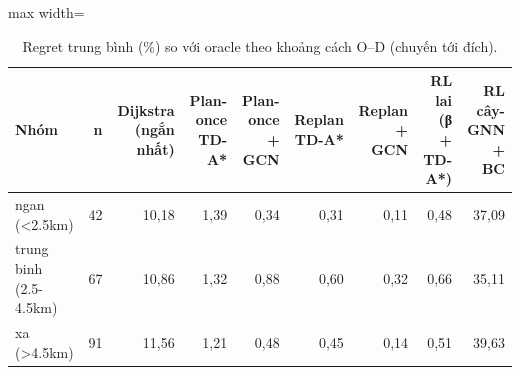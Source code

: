 \begin{table}[!htbp]
\centering
\small
\caption{Regret trung bình (\%) so với oracle theo khoảng cách O–D (chuyến tới đích).}
\label{tab:tab_by_distance}
\begin{adjustbox}{max width=\linewidth}
\begin{tabular}{lrrrrrrrr}
\toprule
Nhóm & n & Dijkstra (ngắn nhất) & Plan-once TD-A* & Plan-once + GCN & Replan TD-A* & Replan + GCN & RL lai (β + TD-A*) & RL cây-GNN + BC \\
\midrule
ngan (<2.5km) & 42 & 10{,}18 & 1{,}39 & 0{,}34 & 0{,}31 & 0{,}11 & 0{,}48 & 37{,}09 \\
trung binh (2.5-4.5km) & 67 & 10{,}86 & 1{,}32 & 0{,}88 & 0{,}60 & 0{,}32 & 0{,}66 & 35{,}11 \\
xa (>4.5km) & 91 & 11{,}56 & 1{,}21 & 0{,}48 & 0{,}45 & 0{,}14 & 0{,}51 & 39{,}63 \\
\bottomrule
\end{tabular}
\end{adjustbox}
\end{table}
